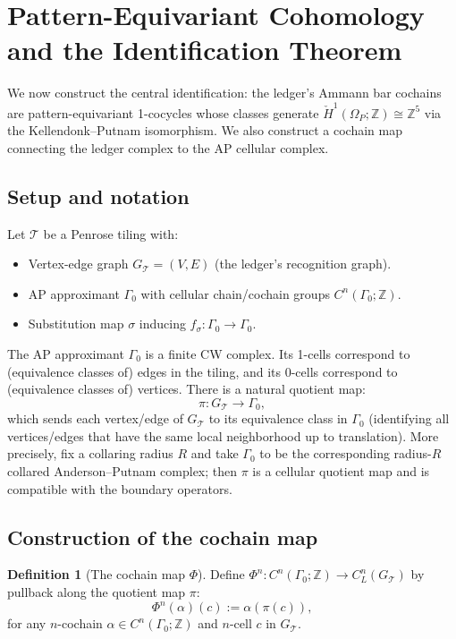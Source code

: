 \documentclass[12pt]{article}
\theoremstyle{definition}
\newtheorem{definition}[theorem]{Definition}
\theoremstyle{remark}
\newcommand{\ZZ}{\mathbb{Z}}
\newcommand{\Hcech}{\check{H}}
\begin{document}
\section{Pattern-Equivariant Cohomology and the Identification Theorem}
\label{sec:cochain-map}

We now construct the central identification: the ledger's Ammann bar cochains are pattern-equivariant 1-cocycles whose classes generate $\Hcech^1(\Omega_P; \ZZ) \cong \ZZ^5$ via the Kellendonk--Putnam isomorphism. We also construct a cochain map connecting the ledger complex to the AP cellular complex.

\subsection{Setup and notation}

Let $\mathcal{T}$ be a Penrose tiling with:
\begin{itemize}
\item Vertex-edge graph $G_{\mathcal{T}} = (V, E)$ (the ledger's recognition graph).
\item AP approximant $\Gamma_0$ with cellular chain/cochain groups $C^n(\Gamma_0; \ZZ)$.
\item Substitution map $\sigma$ inducing $f_\sigma: \Gamma_0 \to \Gamma_0$.
\end{itemize}

The AP approximant $\Gamma_0$ is a finite CW complex. Its 1-cells correspond to (equivalence classes of) edges in the tiling, and its 0-cells correspond to (equivalence classes of) vertices. There is a natural quotient map:
\begin{equation}
\pi: G_{\mathcal{T}} \to \Gamma_0,
\label{eq:quotient-map}
\end{equation}
which sends each vertex/edge of $G_{\mathcal{T}}$ to its equivalence class in $\Gamma_0$ (identifying all vertices/edges that have the same local neighborhood up to translation).
More precisely, fix a collaring radius $R$ and take $\Gamma_0$ to be the corresponding radius-$R$ collared Anderson--Putnam complex; then $\pi$ is a cellular quotient map and is compatible with the boundary operators.

\subsection{Construction of the cochain map}

\begin{definition}[The cochain map $\Phi$]
\label{def:cochain-map}
Define $\Phi^n: C^n(\Gamma_0; \ZZ) \to C^n_L(G_{\mathcal{T}})$ by pullback along the quotient map $\pi$:
\begin{equation}
\Phi^n(\alpha)(c) := \alpha(\pi(c)),
\label{eq:cochain-pullback}
\end{equation}
for any $n$-cochain $\alpha \in C^n(\Gamma_0; \ZZ)$ and $n$-cell $c$ in $G_{\mathcal{T}}$.
\end{definition}
\end{document}

